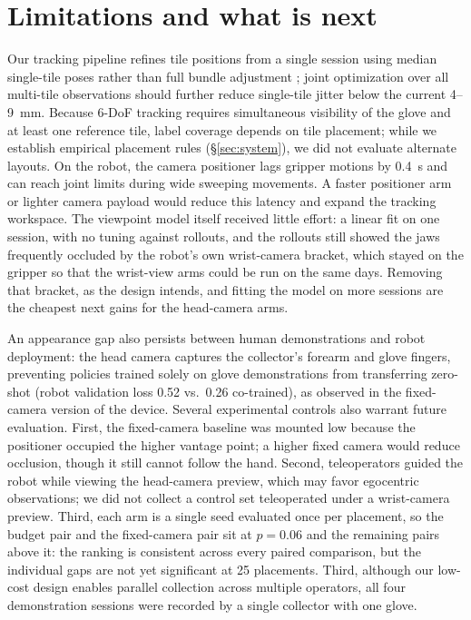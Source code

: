 \section{Limitations and what is next}
\label{sec:discussion}

Our tracking pipeline refines tile positions from a single session using median single-tile poses rather than full bundle adjustment \citep{triggs2000bundle}; joint optimization over all multi-tile observations should further reduce single-tile jitter below the current \SI{4}{}--\SI{9}{mm}.
Because 6-DoF tracking requires simultaneous visibility of the glove and at least one reference tile, label coverage depends on tile placement; while we establish empirical placement rules (\S\ref{sec:system}), we did not evaluate alternate layouts.
On the robot, the camera positioner lags gripper motions by \SI{0.4}{s} and can reach joint limits during wide sweeping movements. A faster positioner arm or lighter camera payload would reduce this latency and expand the tracking workspace. The viewpoint model itself received little effort: a linear fit on one session, with no tuning against rollouts, and the rollouts still showed the jaws frequently occluded by the robot's own wrist-camera bracket, which stayed on the gripper so that the wrist-view arms could be run on the same days. Removing that bracket, as the design intends, and fitting the model on more sessions are the cheapest next gains for the head-camera arms.

An appearance gap also persists between human demonstrations and robot deployment: the head camera captures the collector's forearm and glove fingers, preventing policies trained solely on glove demonstrations from transferring zero-shot (robot validation loss 0.52 vs.\ 0.26 co-trained), as observed in the fixed-camera version of the device.
Several experimental controls also warrant future evaluation.
First, the fixed-camera baseline was mounted low because the positioner occupied the higher vantage point; a higher fixed camera would reduce occlusion, though it still cannot follow the hand.
Second, teleoperators guided the robot while viewing the head-camera preview, which may favor egocentric observations; we did not collect a control set teleoperated under a wrist-camera preview. Third, each arm is a single seed evaluated once per placement, so the budget pair and the fixed-camera pair sit at $p = 0.06$ and the remaining pairs above it: the ranking is consistent across every paired comparison, but the individual gaps are not yet significant at 25 placements.
Third, although our low-cost design enables parallel collection across multiple operators, all four demonstration sessions were recorded by a single collector with one glove.

